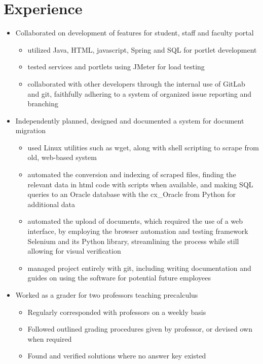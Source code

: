 \documentclass[11pt,a4paper,sans]{moderncv}
\begin{document}
\section{Experience}
%
\begin{itemize}%
\item Collaborated on development of features for student, staff and faculty portal
    \begin{itemize}
    \item utilized Java, HTML, javascript, Spring and SQL for portlet development
    \item tested  services and portlets using JMeter for load testing
    \item collaborated with other developers through the internal use of GitLab 
    and git, faithfully adhering to a system of organized issue reporting and 
    branching
    \end{itemize}
\item Independently planned, designed and documented a system for document migration
    \begin{itemize}%
    \item used Linux utilities such as wget, along with shell scripting to scrape
    from old, web-based system
    \item automated the conversion and indexing of scraped files, finding the 
    relevant data in html code with scripts when available, and making SQL queries
    to an Oracle database with the cx\_Oracle from Python for additional data
    \item automated the upload of documents, which required the use of a web 
    interface, by employing the browser automation and testing framework Selenium 
    and its Python library, streamlining the process while still allowing for 
    visual verification
    \item managed project entirely with git, including writing documentation and 
    guides on using the software for potential future employees
    \end{itemize}
\end{itemize}
\begin{itemize}
\item Worked as a grader for two professors teaching precalculus
    \begin{itemize}
    \item Regularly corresponded with professors on a weekly basis
    \item Followed outlined grading procedures given by professor, or devised own when required
    \item Found and verified solutions where no answer key existed
    \end{itemize}
\end{itemize}
\end{document}

